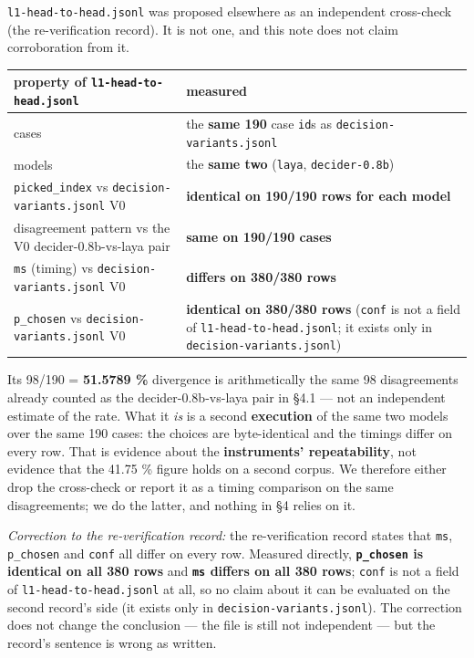 \documentclass[11pt,a4paper]{article}
\begin{document}
\texttt{l1-head-to-head.jsonl} was proposed elsewhere as an independent cross-check (the re-verification record). It is not one, and this note does not claim corroboration from it.


\begin{center}
\begin{tabular}{@{}>{\raggedright\arraybackslash}p{}>{\raggedright\arraybackslash}p{}@{}}
\hline
\textbf{property of \texttt{l1-head-to-head.jsonl}} & \textbf{measured} \\ \hline
cases & the \textbf{same 190} case \texttt{id}s as \texttt{decision-variants.jsonl} \\ \hline
models & the \textbf{same two} (\texttt{laya}, \texttt{decider-0.8b}) \\ \hline
\texttt{picked\_index} vs \texttt{decision-variants.jsonl} V0 & \textbf{identical on 190/190 rows for each model} \\ \hline
disagreement pattern vs the V0 decider-0.8b-vs-laya pair & \textbf{same on 190/190 cases} \\ \hline
\texttt{ms} (timing) vs \texttt{decision-variants.jsonl} V0 & \textbf{differs on 380/380 rows} \\ \hline
\texttt{p\_chosen} vs \texttt{decision-variants.jsonl} V0 & \textbf{identical on 380/380 rows} (\texttt{conf} is not a field of \texttt{l1-head-to-head.jsonl}; it exists only in \texttt{decision-variants.jsonl}) \\ \hline
\end{tabular}
\end{center}

Its 98/190 = \textbf{51.5789 \%} divergence is arithmetically the same 98 disagreements already counted as the decider-0.8b-vs-laya pair in \S4.1 --- not an independent estimate of the rate. What it \emph{is} is a second \textbf{execution} of the same two models over the same 190 cases: the choices are byte-identical and the timings differ on every row. That is evidence about the \textbf{instruments' repeatability}, not evidence that the 41.75 \% figure holds on a second corpus. We therefore either drop the cross-check or report it as a timing comparison on the same disagreements; we do the latter, and nothing in \S4 relies on it.

\emph{Correction to the re-verification record:} the re-verification record states that \texttt{ms}, \texttt{p\_chosen} and \texttt{conf} all differ on every row. Measured directly, \textbf{\texttt{p\_chosen} is identical on all 380 rows} and \textbf{\texttt{ms} differs on all 380 rows}; \texttt{conf} is not a field of \texttt{l1-head-to-head.jsonl} at all, so no claim about it can be evaluated on the second record's side (it exists only in \texttt{decision-variants.jsonl}). The correction does not change the conclusion --- the file is still not independent --- but the record's sentence is wrong as written.
\end{document}

